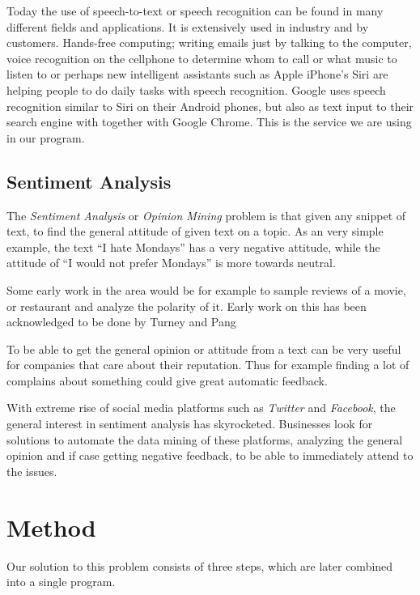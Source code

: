 \documentclass[a4paper,12pt,twoside]{ltxdoc}
\begin{document}
Today the use of speech-to-text or speech recognition can be found in many different fields and applications. It is extensively used in industry and by customers. Hands-free computing; writing emails just by talking to the computer, voice recognition on the cellphone to determine whom to call or what music to listen to or perhaps new intelligent assistants such as Apple iPhone's Siri are helping people to do daily tasks with speech recognition. Google uses speech recognition similar to Siri on their Android phones, but also as text input to their search engine with together with Google Chrome. This is the service we are using in our program.



\subsection{Sentiment Analysis}
The \emph{Sentiment Analysis} or \emph{Opinion Mining} problem is that given any snippet of text, to find the general attitude of given text on a topic.
As an very simple example, the text ``I hate Mondays'' has a very negative attitude, while the attitude of ``I would not prefer Mondays'' is more towards neutral.

Some early work in the area would be for example to sample reviews of a movie, or restaurant and analyze the polarity of it. Early work on this has been acknowledged to be done by Turney\cite{turney} and Pang\cite{pang}

To be able to get the general opinion or attitude from a text can be very useful for companies that care about their reputation.
Thus for example finding a lot of complains about something could give great automatic feedback.

With extreme rise of social media platforms such as \emph{Twitter} and \emph{Facebook}, the general interest in sentiment analysis has skyrocketed. Businesses look for solutions to automate the data mining of these platforms, analyzing the general opinion and if case getting negative feedback, to be able to immediately attend to the issues.

\section{Method}

Our solution to this problem consists of three steps, which are later combined into a single program.
\end{document}

